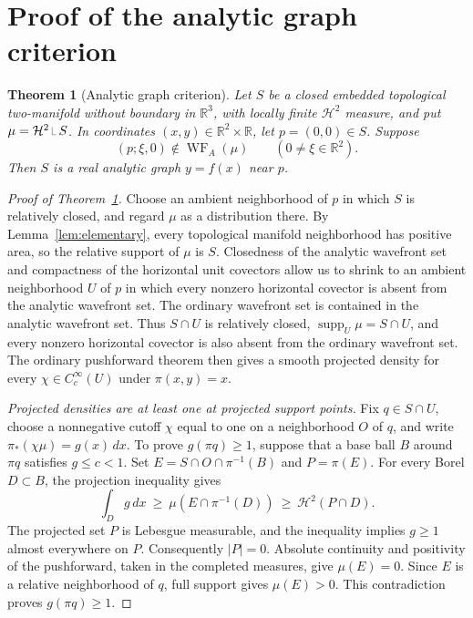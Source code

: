 \documentclass[11pt]{article}
\newtheorem{theorem}{Theorem}[section]
\newcommand{\R}{\mathbb R}
\newcommand{\HH}{\mathcal H}
\newcommand{\WF}{\operatorname{WF}_{A}}
\newcommand{\supp}{\operatorname{supp}}
\newcommand{\dd}{\,d}
\newcommand{\restr}{\mathbin{\vrule height 1.4ex depth 0pt width .06ex\vrule height .06ex depth 0pt width .65ex}}
\begin{document}
\section{Proof of the analytic graph criterion}\label{app:graph}
\begin{theorem}[Analytic graph criterion]\label{thm:graph}
Let $S$ be a closed embedded topological two-manifold without boundary in $\R^3$, with locally finite $\HH^2$ measure, and put $\mu=\HH^2\restr S$. In coordinates $(x,y)\in\R^2\times\R$, let $p=(0,0)\in S$. Suppose
\begin{equation}\label{horizontal}
 (p;\xi,0)\notin\WF(\mu)\qquad(0\ne\xi\in\R^2).
\end{equation}
Then $S$ is a real analytic graph $y=f(x)$ near $p$.
\end{theorem}
\begin{proof}[Proof of Theorem~\ref{thm:graph}]
Choose an ambient neighborhood of $p$ in which $S$ is relatively closed, and regard $\mu$ as a distribution there. By Lemma~\ref{lem:elementary}, every topological manifold neighborhood has positive area, so the relative support of $\mu$ is $S$. Closedness of the analytic wavefront set and compactness of the horizontal unit covectors allow us to shrink to an ambient neighborhood $U$ of $p$ in which every nonzero horizontal covector is absent from the analytic wavefront set. The ordinary wavefront set is contained in the analytic wavefront set. Thus $S\cap U$ is relatively closed, $\supp_U\mu=S\cap U$, and every nonzero horizontal covector is also absent from the ordinary wavefront set. The ordinary pushforward theorem then gives a smooth projected density for every $\chi\in C_c^\infty(U)$ under $\pi(x,y)=x$.

\emph{Projected densities are at least one at projected support points.}
Fix $q\in S\cap U$, choose a nonnegative cutoff $\chi$ equal to one on a neighborhood $O$ of $q$, and write $\pi_*(\chi\mu)=g(x)\dd x$. To prove $g(\pi q)\ge1$, suppose that a base ball $B$ around $\pi q$ satisfies $g\le c<1$. Set $E=S\cap O\cap\pi^{-1}(B)$ and $P=\pi(E)$. For every Borel $D\subset B$, the projection inequality gives
\[
 \int_Dg\dd x\ \ge\ \mu(E\cap\pi^{-1}(D))
 \ \ge\ \HH^2(P\cap D).
\]
The projected set $P$ is Lebesgue measurable, and the inequality implies $g\ge1$ almost everywhere on $P$. Consequently $|P|=0$. Absolute continuity and positivity of the pushforward, taken in the completed measures, give $\mu(E)=0$. Since $E$ is a relative neighborhood of $q$, full support gives $\mu(E)>0$. This contradiction proves $g(\pi q)\ge1$.


\end{proof}
\end{document}
